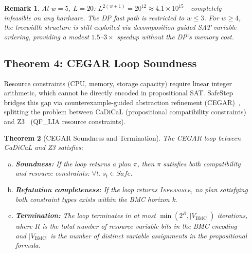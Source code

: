 \documentclass[10pt,twocolumn]{article}
\newtheorem{theorem}{Theorem}[section]
\newtheorem{remark}[theorem]{Remark}
\begin{document}
\begin{remark}
At $w=5$, $L=20$: $L^{2(w+1)} = 20^{12} \approx 4.1 \times 10^{15}$---completely infeasible on any hardware. The DP fast path is restricted to $w \leq 3$. For $w \geq 4$, the treewidth structure is still exploited via decomposition-guided SAT variable ordering, providing a modest $1.5$--$3\times$ speedup without the DP's memory cost.
\end{remark}

\subsection{Theorem 4: CEGAR Loop Soundness}
\label{sec:cegar-theory}

Resource constraints (CPU, memory, storage capacity) require linear integer arithmetic, which cannot be directly encoded in propositional SAT. SafeStep bridges this gap via counterexample-guided abstraction refinement (CEGAR)~\cite{clarke2003cegar}, splitting the problem between CaDiCaL (propositional compatibility constraints) and Z3~\cite{demoura2008z3} (QF\_LIA resource constraints).

\begin{theorem}[CEGAR Soundness and Termination]
\label{thm:cegar}
The CEGAR loop between CaDiCaL and Z3 satisfies:
\begin{enumerate}[(a)]
\item \textbf{Soundness:} If the loop returns a plan $\pi$, then $\pi$ satisfies both compatibility and resource constraints: $\forall t.\; s_t \in \mathit{Safe}$.
\item \textbf{Refutation completeness:} If the loop returns \textsc{Infeasible}, no plan satisfying both constraint types exists within the BMC horizon $k$.
\item \textbf{Termination:} The loop terminates in at most $\min(2^R, |V_{\mathrm{BMC}}|)$ iterations, where $R$ is the total number of resource-variable bits in the BMC encoding and $|V_{\mathrm{BMC}}|$ is the number of distinct variable assignments in the propositional formula.
\end{enumerate}
\end{theorem}
\end{document}
